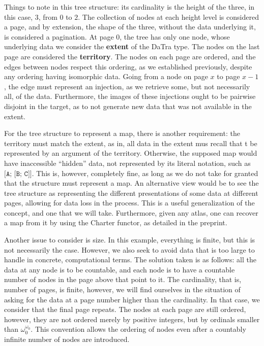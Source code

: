 \documentclass[11pt]{article}
\newcommand{\code}[1]{\texttt{#1}}
\begin{document}
Things to note in this tree structure: its cardinality is the height of the
three, in this case, \(3\), from \(0\) to \(2\). The collection of nodes at
each height level is considered a page, and by extension, the shape of the
three, without the data underlying it, is considered a pagination. At page
\(0\), the tree has only one node, whose underlying data we consider the
\textbf{extent} of the DaTra type. The nodes on the last page are considered
the \textbf{territory}. The nodes on each page are ordered, and the edges
between nodes respect this ordering, as we established previously, despite
any ordering having isomorphic data. Going from a node on page \(x\) to page
\(x - 1\), the edge must represent an injection, as we retrieve some, but
not necessarily all, of the data. Furthermore, the images of these
injections ought to be pairwise disjoint in the target, as to not generate
new data that was not available in the extent.

For the tree structure to represent a map, there is another requirement: the
territory must match the extent, as in, all data in the extent mus recall
that t be represented by an argument of the territory. Otherwise, the
supposed map would have inaccessible ``hidden'' data, not represented by its
literal notation, such as \(\code{[A; [B; C]]}\). This is, however,
completely fine, as long as we do not take for granted that the structure
must represent a map. An alternative view would be to see the tree structure
as representing the different presentations of some data at different
pages, allowing for data loss in the process. This is a useful generalization
of the concept, and one that we will take. Furthermore, given any atlas, one
can recover a map from it by using the Charter functor, as detailed in the
preprint.

Another issue to consider is size. In this example, everything is finite,
but this is not necessarily the case. However, we also seek to avoid data
that is too large to handle in concrete, computational terms. The solution
taken is as follows: all the data at any node is to be countable, and each
node is to have a countable number of nodes in the page above that point to
it. The cardinality, that is, number of pages, is finite, however, we will
find ourselves in the situation of asking for the data at a page number
higher than the cardinality. In that case, we consider that the final page
repeats. The nodes at each page are still ordered, however, they are not
ordered merely by positive integers, but by ordinals smaller than
\(\omega_0^{\omega_0}\). This convention allows the ordering of nodes even
after a countably infinite number of nodes are introduced.
\end{document}
